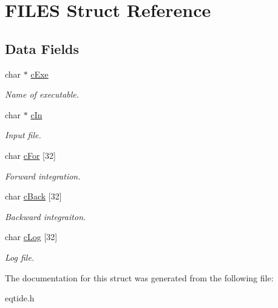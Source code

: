 \hypertarget{struct_f_i_l_e_s}{}\section{F\+I\+L\+E\+S Struct Reference}
\label{struct_f_i_l_e_s}
\subsection*{Data Fields}
\begin{DoxyCompactItemize}
\item 
\hypertarget{struct_f_i_l_e_s_a3e83345ff9835b0981aa247bc3caf8c4}{}char $\ast$ \hyperlink{struct_f_i_l_e_s_a3e83345ff9835b0981aa247bc3caf8c4}{c\+Exe}\label{struct_f_i_l_e_s_a3e83345ff9835b0981aa247bc3caf8c4}

\begin{DoxyCompactList}\small\item\em Name of executable. \end{DoxyCompactList}\item 
\hypertarget{struct_f_i_l_e_s_adc68abe20a3b4229014d48afaa0203aa}{}char $\ast$ \hyperlink{struct_f_i_l_e_s_adc68abe20a3b4229014d48afaa0203aa}{c\+In}\label{struct_f_i_l_e_s_adc68abe20a3b4229014d48afaa0203aa}

\begin{DoxyCompactList}\small\item\em Input file. \end{DoxyCompactList}\item 
\hypertarget{struct_f_i_l_e_s_a9194694a20dc12a61ed71a6c41cda044}{}char \hyperlink{struct_f_i_l_e_s_a9194694a20dc12a61ed71a6c41cda044}{c\+For} \mbox{[}32\mbox{]}\label{struct_f_i_l_e_s_a9194694a20dc12a61ed71a6c41cda044}

\begin{DoxyCompactList}\small\item\em Forward integration. \end{DoxyCompactList}\item 
\hypertarget{struct_f_i_l_e_s_a08ced773fb1fe4f608b21f7eebc70b7b}{}char \hyperlink{struct_f_i_l_e_s_a08ced773fb1fe4f608b21f7eebc70b7b}{c\+Back} \mbox{[}32\mbox{]}\label{struct_f_i_l_e_s_a08ced773fb1fe4f608b21f7eebc70b7b}

\begin{DoxyCompactList}\small\item\em Backward integraiton. \end{DoxyCompactList}\item 
\hypertarget{struct_f_i_l_e_s_adb96f839470f80eff7236b7daa36c8c0}{}char \hyperlink{struct_f_i_l_e_s_adb96f839470f80eff7236b7daa36c8c0}{c\+Log} \mbox{[}32\mbox{]}\label{struct_f_i_l_e_s_adb96f839470f80eff7236b7daa36c8c0}

\begin{DoxyCompactList}\small\item\em Log file. \end{DoxyCompactList}\end{DoxyCompactItemize}


The documentation for this struct was generated from the following file\+:\begin{DoxyCompactItemize}
\item 
eqtide.\+h\end{DoxyCompactItemize}

